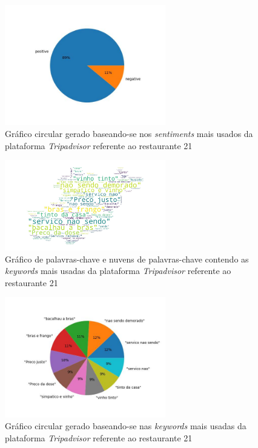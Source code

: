 \begin{figure}[!htb]
\centering
\includegraphics[width=7cm]{figuras/TripAdvisor/Restaurants/restaurant21_sentiments.jpeg}
\caption{Gráfico circular gerado baseando-se nos \textit{sentiments} mais usados da plataforma \textit{Tripadvisor} referente ao restaurante 21}
\label{fig:exemplofig}
\end{figure}

\begin{figure}[!htb]
\centering
\includegraphics[width=7cm]{figuras/TripAdvisor/Restaurants/restaurant21_keywordcloud.jpeg}
\caption{Gráfico de palavras-chave e nuvens de palavras-chave contendo as \textit{keywords} mais usadas da plataforma \textit{Tripadvisor} referente ao restaurante 21}
\label{fig:exemplofig}
\end{figure}

\begin{figure}[!htb]
\centering
\includegraphics[width=7cm]{figuras/TripAdvisor/Restaurants/restaurant21_keywords.jpeg}
\caption{Gráfico circular gerado baseando-se nas \textit{keywords} mais usadas da plataforma \textit{Tripadvisor} referente ao restaurante 21}
\label{fig:exemplofig}
\end{figure}

